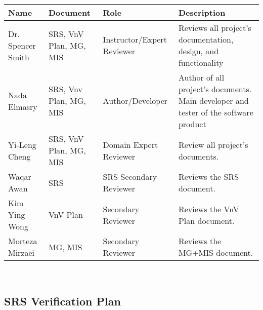 \documentclass[12pt, titlepage]{article}
\begin{document}
\noindent
\begin{minipage}{\textwidth}
  \renewcommand*{\arraystretch}{1.5}
  \begin{tabular}{| l | p{}|p{}|p{}|}
    \hline
    \textbf{Name}     & \textbf{Document}      & \textbf{Role}              & \textbf{Description}                                                                 \\
    \hline
    Dr. Spencer Smith & SRS, VnV Plan, MG, MIS & Instructor/Expert Reviewer & Reviews all project's documentation, design, and functionality                       \\
    \hline
    Nada Elmasry      & SRS, Vnv Plan, MG, MIS & Author/Developer           & Author of all project's documents. Main developer and tester of the software product \\
    \hline
    Yi-Leng Cheng     & SRS, VnV Plan, MG, MIS & Domain Expert Reviewer     & Review all project's documents.                                                      \\
    \hline
    Waqar Awan        & SRS                    & SRS Secondary Reviewer     & Reviews the SRS document.                                                            \\
    \hline
    Kim Ying Wong     & VnV Plan               & Secondary Reviewer         & Reviews the VnV Plan document.                                                       \\
    \hline
    Morteza Mirzaei   & MG, MIS                & Secondary Reviewer         & Reviews the MG+MIS document.                                                         \\
    \hline
  \end{tabular}
  \label{VnVTeamTable}
\end{minipage}\\

\subsection{SRS Verification Plan} \label{section4.2}


\end{document}

